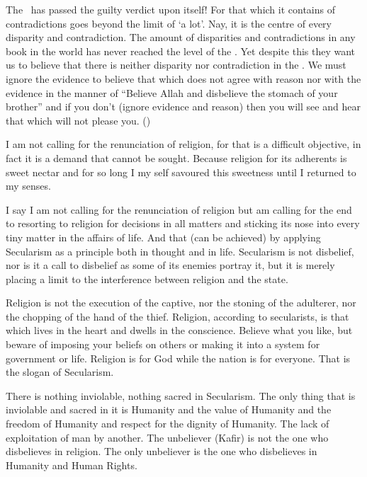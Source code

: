 \documentclass[12pt]{memoir}
\begin{document}
The \Quran\ has passed the guilty verdict upon itself! For that which it
contains of contradictions goes beyond the limit of ‘a lot’. Nay, it is the
centre of every disparity and contradiction. The amount of disparities and
contradictions in any book in the world has never reached the level of the
\Quran.
Yet despite this they want us to believe
that there is neither disparity nor contradiction in the \Quran.
We must ignore the evidence to believe that which
does not agree with reason nor with the evidence in the manner of “Believe
Allah and disbelieve the stomach of your brother”
and if you don’t (ignore evidence and reason) then you will see and hear that
which will not please you.
()

I am not calling for the renunciation of religion, for that is a difficult
objective, in fact it is a demand that cannot be sought. Because religion for
its adherents is sweet nectar and for so long I my self savoured this sweetness
until I returned to my senses.

I say I am not calling for the renunciation of religion but am calling for the
end to resorting to religion for decisions in all matters and sticking its nose
into every tiny matter in the affairs of life. And that (can be achieved) by
applying Secularism as a principle both in thought and in life. Secularism is
not disbelief, nor is it a call to disbelief as some of its enemies portray
it, but it is merely placing a limit to the interference between religion and
the state.

Religion is not the execution of the captive, nor the stoning of the adulterer,
nor the chopping of the hand of the thief. Religion, according to secularists,
is that which lives in the heart and dwells in the conscience.
Believe what you like, but beware of imposing your beliefs on others
or making it into a system for government or life.
Religion is for God while the nation is for everyone.
That is the slogan of Secularism.

There is nothing inviolable, nothing sacred in Secularism. The only thing that
is inviolable and sacred in it is Humanity and the value of Humanity and the
freedom of Humanity and respect for the dignity of Humanity. The lack of
exploitation of man by another. The unbeliever (Kafir) is not the one who
disbelieves in religion. The only unbeliever is the one who disbelieves in
Humanity and Human Rights.
\end{document}

